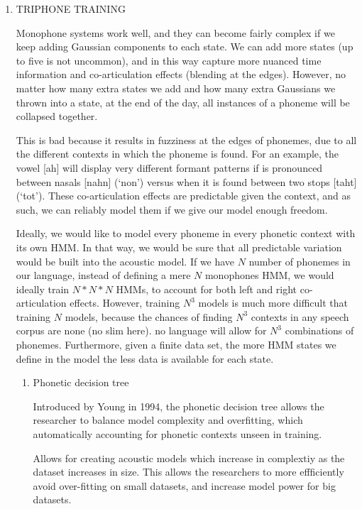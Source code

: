 \documentclass[10pt,a4paper]{article}
\begin{document}
\begin{enumerate}
\item TRIPHONE TRAINING

  Monophone systems work well, and they can become fairly complex if we keep adding Gaussian components to each state. We can add more states (up to five is not uncommon), and in this way capture more nuanced time information and co-articulation effects (blending at the edges). However, no matter how many extra states we add and how many extra Gaussians we thrown into a state, at the end of the day, all instances of a phoneme will be collapsed together.

  This is bad because it results in fuzziness at the edges of phonemes, due to all the different contexts in which the phoneme is found. For an example, the vowel [ah] will display very different formant patterns if is pronounced between nasals [nahn] (`non') versus when it is found between two stops [taht] (`tot'). These co-articulation effects are predictable given the context, and as such, we can reliably model them if we give our model enough freedom.

  Ideally, we would like to model every phoneme in every phonetic context with its own HMM. In that way, we would be sure that all predictable variation would be built into the acoustic model. If we have $N$ number of phonemes in our language, instead of defining a mere $N$ monophones HMM, we would ideally train $N*N*N$ HMMs, to account for both left and right co-articulation effects. However, training $N^3$ models is much more difficult that training $N$ models, because the chances of finding $N^3$ contexts in any speech corpus are none (no slim here). no language will allow for $N^3$ combinations of phonemes. Furthermore, given a finite data set, the more HMM states we define in the model the less data is available for each state.
  
    \begin{enumerate}
    \item Phonetic decision tree
      
      Introduced by Young in 1994, the phonetic decision tree allows the researcher to balance model complexity and overfitting, which automatically accounting for phonetic contexts unseen in training.
      
      Allows for creating acoustic models which increase in complextiy as the dataset increases in size. This allows the researchers to more effficiently avoid over-fitting on small datasets, and increase model power for big datasets.


\end{enumerate}
\end{enumerate}
\end{document}
